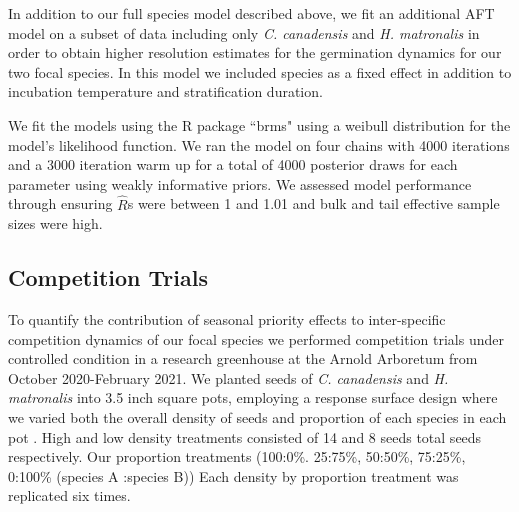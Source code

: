 \documentclass{article}[11pt]
\begin{document}
In addition to our full species model described above, we fit an additional AFT model on a subset of data including only \textit{C. canadensis} and \textit{H. matronalis} in order to obtain higher resolution estimates for the germination dynamics for our two focal species. In this model we included species as a fixed effect in addition to incubation temperature and stratification duration. 

\noindent We fit the models using the R package ``brms" \citep{Burkner2018} using a weibull distribution for the model's likelihood function. We ran the model on four chains with 4000 iterations and a 3000 iteration warm up for a total of 4000 posterior draws for each parameter using weakly informative priors. We assessed  model performance through ensuring $\hat{R}$s were between 1 and 1.01 and bulk and tail effective sample sizes were high.

\subsection*{Competition Trials}
\noindent To quantify the contribution of seasonal priority effects to inter-specific competition dynamics of our focal species we performed competition trials under controlled condition in a research greenhouse at the Arnold Arboretum from October 2020-February 2021. We planted seeds of \textit{C. canadensis} and \textit{H. matronalis} into 3.5 inch square pots, employing a response surface design where we varied both the overall density of seeds and proportion of each species in each pot \citep{Inouye2001}. High and low density treatments consisted of 14 and 8 seeds total seeds respectively. Our proportion treatments (100:0\%. 25:75\%, 50:50\%, 75:25\%, 0:100\% (species A :species B)) Each density by proportion treatment was replicated six times. %
\end{document}
